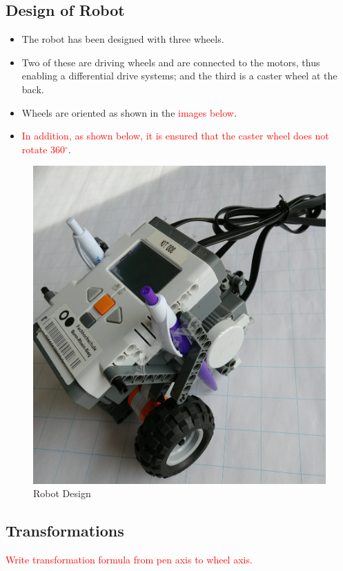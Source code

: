 \documentclass[10pt,a4paper]{article}
\begin{document}
	\subsection{Design of Robot}
		\begin{itemize}
			\item The robot has been designed with three wheels.
			\item Two of these are driving wheels and are connected to the motors, thus enabling a differential drive systems; and the third is a caster wheel at the back.
			\item Wheels are oriented as shown in the \textcolor{red}{images below}.
			\item \textcolor{red}{In addition, as shown below, it is ensured that the caster wheel does not rotate 360$^\circ$}.
		\end{itemize}
		\begin{figure}[h]
			\centering
			\includegraphics[scale=0.1]{bot.jpg}
			\caption{Robot Design}
		\end{figure}
	\subsection{Transformations}
		\textcolor{red}{
			Write transformation formula from pen axis to wheel axis.
			}
\end{document}
